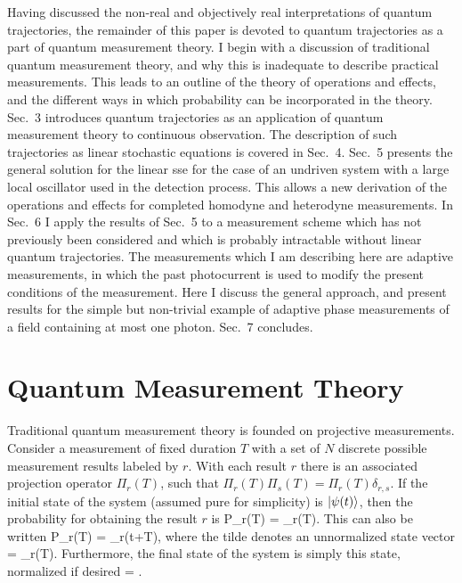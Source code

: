 \documentclass[12pt]{article}
\begin{document}
Having discussed the non-real and objectively real interpretations of quantum
trajectories, the remainder of this paper is devoted to quantum trajectories as
a part of quantum measurement theory. I begin with a discussion of traditional
quantum measurement theory, and why this is inadequate to describe practical
measurements. This leads to an outline of the theory of operations and effects,
and the different ways in which probability can be incorporated in the theory.
Sec.~3 introduces quantum trajectories as an application of quantum measurement
theory to continuous observation. The description of such trajectories as linear
stochastic \sch equations is covered in Sec.~4. Sec.~5 presents the general
solution for the linear {\sc sse} for the case of an undriven system with a large local
oscillator used in the detection process. This allows a new derivation of the
operations and effects for completed homodyne and heterodyne measurements. In
Sec.~6 I apply the results of Sec.~5 to a measurement scheme which has not
previously been considered and which is probably intractable without linear
quantum trajectories. The measurements which I am describing here are adaptive
measurements, in which the past photocurrent is used to modify the present
conditions of the measurement. 
Here I discuss the general approach, and present results for the simple but
non-trivial example of adaptive phase measurements of a field containing at most
one photon. Sec.~7 concludes.

\section{Quantum Measurement Theory}

Traditional quantum measurement theory is founded on projective measurements.
Consider a measurement of fixed duration $T$ with a set of $N$ discrete possible
measurement results labeled by $r$. With each result $r$ there is an
associated projection operator $\Pi_r(T)$, such that
$\Pi_r(T)\Pi_s(T)=\Pi_r(T)\delta_{r,s}$. If the initial state of the system
(assumed pure for simplicity) is $| {\psi(t)} \rangle$, then the probability for
obtaining the result $r$ is \beq
P_r(T) = \Pi_r(T).
\eeq
This can also be written
\beq
P_r(T) = \tilde{\psi}_r(t+T)\rangle,
\eeq
where the tilde denotes an unnormalized state vector
\beq
{} = \Pi_r(T).
\eeq
Furthermore, the final state of the system is simply this state, normalized if
desired 
\beq
{} = .
\eeq
\end{document}
